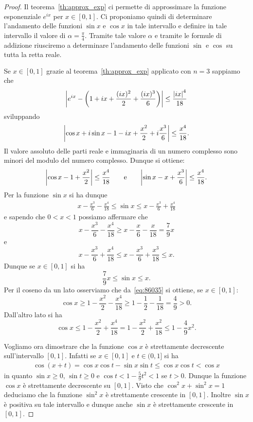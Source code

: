 \begin{proof}
Il teorema~\ref{th:approx_exp} ci permette di approssimare la 
funzione esponenziale $e^{ix}$ per $x\in [0,1]$. 
Ci proponiamo quindi di determinare l'andamento delle funzioni 
$\sin x$ e $\cos x$ in tale intervallo e definire in tale intervallo 
il valore di $\alpha=\frac \pi 4$.
Tramite tale valore $\alpha$ e tramite le formule di addizione riusciremo 
a determinare l'andamento delle funzioni $\sin$ e $\cos$ su tutta la 
retta reale.

Se $x\in[0,1]$ grazie al teorema~\ref{th:approx_exp} applicato 
con $n=3$ sappiamo che 
\begin{align*}
  {\left|e^{ix} - {\left( 1 + ix  + \frac{(ix)^2}{2} + \frac{(ix)^3}{6} \right)}\right|}
  \le \frac{{\left|ix\right|}^4}{18}
\end{align*}
sviluppando
\begin{align*}
  {\left|\cos x + i \sin x - 1 - ix + \frac{x^2}{2} + i\frac{x^3}{6}\right|}
  \le \frac{x^4}{18}.
\end{align*}
Il valore assoluto delle parti reale e immaginaria di un numero 
complesso sono minori del modulo del numero complesso.
Dunque si ottiene:
\begin{align}\label{eq:86035}
    \abs{\cos x - 1 + \frac{x^2}{2}} \le \frac{x^4}{18}\smallskip
    \qquad\text{e}\qquad
    \abs{\sin x - x + \frac{x^3}{6}} \le \frac{x^4}{18}.
\end{align}
Per la funzione $\sin x$ si ha dunque
\begin{align*}
    x - \frac{x^3}{6} - \frac{x^4}{18}
    \le \sin x 
    \le x - \frac{x^3}{6} + \frac{x^4}{18}
\end{align*}
e sapendo che $0<x<1$ possiamo affermare che 
\[
  x - \frac{x^3}{6} - \frac{x^4}{18}
  \ge x - \frac{x}{6} - \frac{x}{18}
  = \frac{7}{9} x
\]
e 
\[
  x - \frac{x^3}{6} + \frac{x^4}{18}
  \le x - \frac{x^3}{6} + \frac{x^3}{18}
  \le x.
\]
Dunque se $x\in[0,1]$ si ha 
\begin{equation}\label{eq:4757614}
  \frac{7}{9} x \le \sin x \le x.
\end{equation}
Per il coseno da un lato osserviamo che da~\eqref{eq:86035}
si ottiene, se $x\in [0,1]$:
\[
\cos x 
  \ge 1 - \frac{x^2}{2} -\frac{x^4}{18}   
  \ge 1 - \frac{1}{2} - \frac{1}{18}
  = \frac 4 9 > 0.
\]
Dall'altro lato si ha
\[
\cos x 
\le 1 - \frac{x^2}{2} + \frac{x^4}{18}
= 1 - \frac{x^2}{2} + \frac{x^2}{18}
\le 1 - \frac{4}{9} x^2.
\]

Vogliamo ora dimostrare che la funzione $\cos x$ 
è strettamente decrescente sull'intervallo $[0,1]$.
Infatti se $x\in[0,1]$ e $t\in(0,1]$ si ha 
\begin{align*}
  \cos(x+t) 
  = \cos x \cos t - \sin x \sin t
  \le \cos x \cos t < \cos x
\end{align*}
in quanto $\sin x\ge 0$, $\sin t \ge 0$ 
e $\cos t < 1 - \frac{5}{9}t^2 < 1$ se $t>0$.
Dunque la funzione $\cos x$ è strettamente 
decrescente su $[0,1]$. 
Visto che $\cos^2 x + \sin^2 x = 1$ 
deduciamo che la funzione $\sin^2 x$ 
è strettamente crescente in $[0,1]$.
Inoltre $\sin x$ è positiva su tale 
intervallo e dunque anche $\sin x$
è strettamente crescente in $[0,1]$.


\end{proof}
